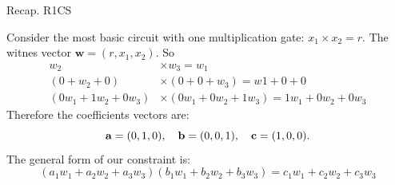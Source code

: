 \documentclass{zkdl-presentation-template}
\begin{document}
    \begin{frame}{Recap. R1CS}
        \begin{example}
            Consider the most basic circuit with one multiplication gate: $x_1 \times x_2 = r$.
            The witnes vector $\mathbf{w} = (r, x_1, x_2)$. So
            \vspace{-5pt}
            \begin{align*}
                w_2 &\times w_3 = w_1 \\
                (0 + w_2 + 0) &\times (0 + 0 + w_3) = w1 + 0 + 0 \\
                (0w_1 + 1w_2 + 0w_3) &\times (0w_1 + 0w_2 + 1w_3) = 1w_1 + 0w_2 + 0w_3
            \end{align*}
            Therefore the coefficients vectors are:
            \vspace{-5pt}
            \begin{equation*}
                \mathbf{a} = (0, 1, 0), \quad \mathbf{b} = (0, 0, 1), \quad \mathbf{c} = (1, 0, 0). 
                \vspace{-5pt}
            \end{equation*}
            The general form of our constraint is:
            \vspace{-5pt}
            \begin{equation*}
                (a_1w_1 + a_2w_2 + a_3w_3)(b_1w_1 + b_2w_2 + b_3w_3) = c_1w_1 + c_2w_2 + c_3w_3
            \end{equation*}
        \end{example}
    \end{frame}
\end{document}
